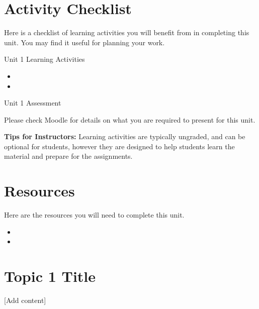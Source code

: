\documentclass[
]{book}
\providecommand{\tightlist}{%
  \setlength{\itemsep}{0pt}\setlength{\parskip}{0pt}}
\begin{document}
\hypertarget{activity-checklist-1}{%
\section*{Activity Checklist}\label{activity-checklist-1}}

Here is a checklist of learning activities you will benefit from in completing this unit. You may find it useful for planning your work.

\begin{reflect}
{Unit 1 Learning Activities }

\begin{itemize}
\tightlist
\item
\item
\end{itemize}
\end{reflect}

\begin{assessment}
{Unit 1 Assessment}

Please check Moodle for details on what you are required to present for this unit.
\end{assessment}

\begin{feedback}
\textbf{Tips for Instructors:}
Learning activities are typically ungraded, and can be optional for students, however they are designed to help students learn the material and prepare for the assignments.
\end{feedback}

\hypertarget{resources-1}{%
\section*{Resources}\label{resources-1}}

Here are the resources you will need to complete this unit.

\begin{itemize}
\tightlist
\item
\item
\end{itemize}

\hypertarget{topic-1-title}{%
\section{Topic 1 Title}\label{topic-1-title}}

{[}Add content{]}
\end{document}
